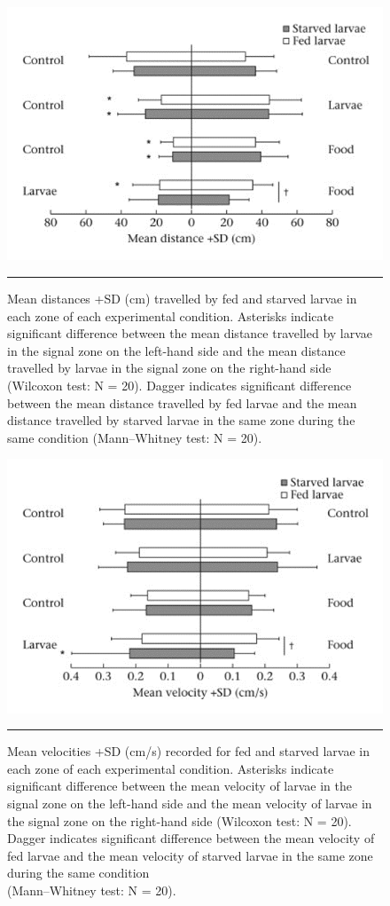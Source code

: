 \begin{figure}[p]
	\centering
    \includegraphics[width=0.8 \textwidth]{Figures/distance.png}
    \rule{35em}{0.5pt}
    \caption{Mean distances +SD (cm) travelled by fed and starved larvae in each zone of each experimental condition. Asterisks indicate significant difference between the mean distance travelled by larvae in the signal zone on the left-hand side and the mean distance travelled by larvae in the signal zone on the right-hand side (Wilcoxon test: N = 20). Dagger indicates significant difference between the mean distance travelled by fed larvae and the mean distance travelled by starved larvae in the same zone during the same condition (Mann–Whitney test: N = 20).}
    \label{fig:distance}  

	\centering
    \includegraphics[width=0.8 \textwidth]{Figures/velocity.png}
    \rule{35em}{0.5pt}
    \caption{Mean velocities +SD (cm/s) recorded for fed and starved larvae in each zone of each experimental condition. Asterisks indicate significant difference between the mean velocity of larvae in the signal zone on the left-hand side and the mean velocity of larvae in the signal zone on the right-hand side (Wilcoxon test: N = 20). Dagger indicates significant difference between the mean velocity of fed larvae and the mean velocity of starved larvae in the same zone during the same condition \\(Mann–Whitney test: N = 20).}
    \label{fig:velocity}  
\end{figure}

